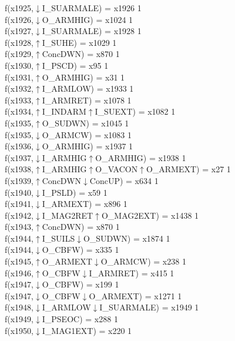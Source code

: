 f(x1925,$\downarrow$I\_SUARMALE) = x1926 {1} \\
f(x1926,$\downarrow$O\_ARMHIG) = x1024 {1} \\
f(x1927,$\downarrow$I\_SUARMALE) = x1928 {1} \\
f(x1928,$\uparrow$I\_SUHE) = x1029 {1} \\
f(x1929,$\uparrow$ConcDWN) = x870 {1} \\
f(x1930,$\uparrow$I\_PSCD) = x95 {1} \\
f(x1931,$\uparrow$O\_ARMHIG) = x31 {1} \\
f(x1932,$\uparrow$I\_ARMLOW) = x1933 {1} \\
f(x1933,$\uparrow$I\_ARMRET) = x1078 {1} \\
f(x1934,$\uparrow$I\_INDARM$\uparrow$I\_SUEXT) = x1082 {1} \\
f(x1935,$\uparrow$O\_SUDWN) = x1045 {1} \\
f(x1935,$\downarrow$O\_ARMCW) = x1083 {1} \\
f(x1936,$\downarrow$O\_ARMHIG) = x1937 {1} \\
f(x1937,$\downarrow$I\_ARMHIG$\uparrow$O\_ARMHIG) = x1938 {1} \\
f(x1938,$\uparrow$I\_ARMHIG$\uparrow$O\_VACON$\uparrow$O\_ARMEXT) = x27 {1} \\
f(x1939,$\uparrow$ConcDWN$\downarrow$ConcUP) = x634 {1} \\
f(x1940,$\downarrow$I\_PSLD) = x59 {1} \\
f(x1941,$\downarrow$I\_ARMEXT) = x896 {1} \\
f(x1942,$\downarrow$I\_MAG2RET$\uparrow$O\_MAG2EXT) = x1438 {1} \\
f(x1943,$\uparrow$ConcDWN) = x870 {1} \\
f(x1944,$\uparrow$I\_SUILS$\downarrow$O\_SUDWN) = x1874 {1} \\
f(x1944,$\downarrow$O\_CBFW) = x335 {1} \\
f(x1945,$\uparrow$O\_ARMEXT$\downarrow$O\_ARMCW) = x238 {1} \\
f(x1946,$\uparrow$O\_CBFW$\downarrow$I\_ARMRET) = x415 {1} \\
f(x1947,$\downarrow$O\_CBFW) = x199 {1} \\
f(x1947,$\downarrow$O\_CBFW$\downarrow$O\_ARMEXT) = x1271 {1} \\
f(x1948,$\downarrow$I\_ARMLOW$\downarrow$I\_SUARMALE) = x1949 {1} \\
f(x1949,$\downarrow$I\_PSEOC) = x288 {1} \\
f(x1950,$\downarrow$I\_MAG1EXT) = x220 {1} \\
